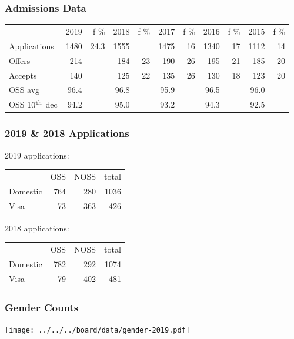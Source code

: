 \documentclass{beamer}
\begin{document}
\begin{frame}
  \frametitle{Admissions Data}

  \footnotesize
  \vfill
  \begin{tabular}{lrrrrrrrrrr}
                 & 2019 & f \% & 2018 & f \% & 2017 & f \% & 2016 & f \% & 2015 & f \%  \\
    Applications & 1480 & 24.3 & 1555 &    & 1475 & 16 & 1340 & 17 & 1112 & 14 \\
    Offers       &  214 &   & 184  & 23 & 190  & 26 & 195 & 21 & 185 & 20 \\
    Accepts      &  140 &   & 125  & 22 & 135  & 26 & 130 & 18 & 123 & 20  \\
    OSS avg      & 96.4&    & 96.8 &    & 95.9 && 96.5 && 96.0  \\
    OSS $10^{\mbox{\scriptsize th}}$ dec & 94.2 & & 95.0 & & 93.2 && 94.3 && 92.5  \\
  \end{tabular}

\end{frame}

\begin{frame}
  \frametitle{2019 \& 2018 Applications}

  2019 applications:

  \begin{center}
  \begin{tabular}{lrrr}
    & OSS & NOSS & total\\
  Domestic  & 764 & 280 & 1036\\
  Visa      & 73  & 363 & 426\\
  \end{tabular}
  \end{center}
  \vspace*{1em}
  2018 applications:

  \begin{center}
  \begin{tabular}{lrrr}
    & OSS & NOSS & total\\
  Domestic  & 782 & 292& 1074\\
  Visa      & 79 & 402 & 481\\
  \end{tabular}
  \end{center}
  
\end{frame}

\begin{frame}
  \frametitle{Gender Counts}
  \texttt{[image: ../../../board/data/gender-2019.pdf]}
\end{frame}
\end{document}
